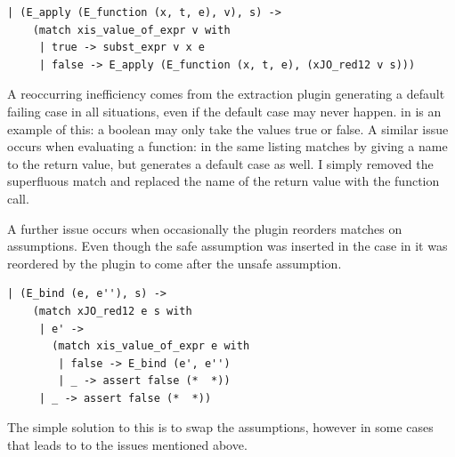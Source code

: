 \documentclass[12pt,twoside,notitlepage]{report}
\theoremstyle{plain}%
\theoremstyle{definition}
\theoremstyle{remark}
\begin{document}
\vspace{3mm}
\begin{minipage}{\linewidth}

\begin{lstlisting}[caption={OCaml fixed substitution case}, label={lst:ocamlfixsub}]
  | (E_apply (E_function (x, t, e), v), s) ->
    (match xis_value_of_expr v with
     | true -> subst_expr v x e
     | false -> E_apply (E_function (x, t, e), (xJO_red12 v s)))
\end{lstlisting}

\end{minipage}
A reoccurring inefficiency comes from the extraction plugin generating a default failing case in all situations, even if the default case may never happen.  in  is an example of this: a boolean may only take the values true or false. A similar issue occurs when evaluating a function:   in the same listing matches by giving a name to the return value, but generates a default case as well. I simply removed the superfluous match and replaced the name of the return value with the function call.

A further issue occurs when occasionally the plugin reorders matches on assumptions. Even though the safe assumption was inserted in the case in  it was reordered by the plugin to come after the unsafe assumption.\vspace{2mm}

\begin{minipage}{\linewidth}
\begin{lstlisting}[caption={OCaml swapped assumptions}, label={lst:ocamlswapassume}]
  | (E_bind (e, e''), s) ->
    (match xJO_red12 e s with
     | e' ->
       (match xis_value_of_expr e with
        | false -> E_bind (e', e'')
        | _ -> assert false (*  *))
     | _ -> assert false (*  *))
\end{lstlisting}

\end{minipage}
The simple solution to this is to swap the assumptions, however in some cases that leads to to the issues mentioned above.
\end{document}
